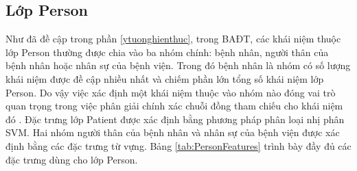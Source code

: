 \subsection*{Lớp Person}
Như đã đề cập trong phần \ref{ytuonghienthuc}, trong BAĐT, các khái niệm thuộc lớp Person thường được chia vào ba nhóm chính: bệnh nhân, người thân của bệnh nhân hoặc nhân sự của bệnh viện. Trong đó bệnh nhân là nhóm có số lượng khái niệm được đề cập nhiều nhất và chiếm phần lớn tổng số khái niệm lớp Person. Do vậy việc xác định một khái niệm thuộc vào nhóm nào đóng vai trò quan trọng trong việc phân giải chính xác chuỗi đồng tham chiếu cho khái niệm đó \cite{YanXu2012}. Đặc trưng lớp Patient được xác định bằng phương pháp phân loại nhị phân SVM. Hai nhóm người thân của bệnh nhân và nhân sự của bệnh viện được xác định bằng các đặc trưng từ vựng. Bảng \ref{tab:PersonFeatures} trình bày đầy đủ các đặc trưng dùng cho lớp Person.

